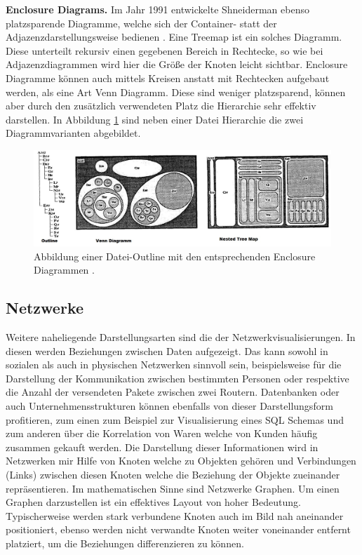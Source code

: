 \documentclass[draft=false
              ,paper=a4
              ,twoside=false
              ,fontsize=11pt
              ,headsepline
              ,BCOR10mm
              ,DIV11
              ]{scrbook}
\begin{document}
\textbf{Enclosure Diagrams.} Im Jahr 1991 entwickelte Shneiderman ebenso platzsparende Diagramme, welche sich der Container- statt der Adjazenzdarstellungsweise bedienen \cite{shneiderman_1991}. Eine Treemap ist ein solches Diagramm. Diese unterteilt rekursiv einen gegebenen Bereich in Rechtecke, so wie bei Adjazenzdiagrammen wird hier die Größe der Knoten leicht sichtbar. Enclosure Diagramme können auch mittels Kreisen anstatt mit Rechtecken aufgebaut werden, als eine Art Venn Diagramm. Diese sind weniger platzsparend, können aber durch den zusätzlich verwendeten Platz die Hierarchie sehr effektiv darstellen. In Abbildung \ref{fig:enclosure} sind neben einer Datei Hierarchie die zwei Diagrammvarianten abgebildet.

\begin{figure}[htbp]
  \centering
  \includegraphics[width=\textwidth]{img/outline}
  \caption{Abbildung einer Datei-Outline mit den entsprechenden Enclosure Diagrammen \cite{shneiderman_1991}.}
  \label{fig:enclosure}
\end{figure}

\subsection{Netzwerke} %
\label{ssub:netzwerke}
Weitere naheliegende Darstellungsarten sind die der Netzwerkvisualisierungen. In diesen werden Beziehungen zwischen Daten aufgezeigt. Das kann sowohl in sozialen als auch in physischen Netzwerken sinnvoll sein, beispielsweise für die Darstellung der Kommunikation zwischen bestimmten Personen oder respektive die Anzahl der versendeten Pakete zwischen zwei Routern. Datenbanken oder auch Unternehmensstrukturen können ebenfalls von dieser Darstellungsform profitieren, zum einen zum Beispiel zur Visualisierung eines SQL Schemas und zum anderen über die Korrelation von Waren welche von Kunden häufig zusammen gekauft werden. Die Darstellung dieser Informationen wird in Netzwerken mir Hilfe von Knoten welche zu Objekten gehören und Verbindungen (Links) zwischen diesen Knoten welche die Beziehung der Objekte zueinander repräsentieren.  Im mathematischen Sinne sind Netzwerke Graphen. Um einen Graphen darzustellen ist ein effektives Layout von hoher Bedeutung. Typischerweise werden stark verbundene Knoten auch im Bild nah aneinander positioniert, ebenso werden nicht verwandte Knoten weiter voneinander entfernt platziert, um die Beziehungen differenzieren zu können.
\end{document}
